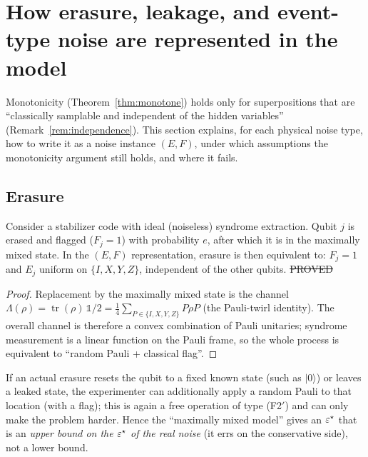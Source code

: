 \section{How erasure, leakage, and event-type noise are represented in the model}\label{sec:repr}

Monotonicity (Theorem~\ref{thm:monotone}) holds only for superpositions that are ``classically samplable and independent of the hidden variables''
(Remark~\ref{rem:independence}). This section explains, for each physical noise type, how to write it as a noise instance $(E,F)$,
under which assumptions the monotonicity argument still holds, and where it fails.

\subsection{Erasure}

\begin{proposition}[Erasure = flagged completely depolarizing noise]\label{prop:erasure}
Consider a stabilizer code with ideal (noiseless) syndrome extraction. Qubit $j$ is erased and flagged ($F_j=1$) with probability $e$, after which it is in the maximally mixed state.
In the $(E,F)$ representation, erasure is then equivalent to: $F_j=1$ and $E_j$ uniform on $\{I,X,Y,Z\}$, independent of the other qubits.
\hfill\st{PROVED}
\end{proposition}
\begin{proof}
Replacement by the maximally mixed state is the channel $\Lambda(\rho)=\operatorname{tr}(\rho)\,\mathbb 1/2=\tfrac14\sum_{P\in\{I,X,Y,Z\}}P\rho P$
(the Pauli-twirl identity). The overall channel is therefore a convex combination of Pauli unitaries; syndrome measurement is a linear function on the Pauli frame,
so the whole process is equivalent to ``random Pauli + classical flag''.
\end{proof}

\begin{remark}[Conservativeness]
If an actual erasure resets the qubit to a fixed known state (such as $\lvert 0\rangle$) or leaves a leaked state, the experimenter can additionally apply a random Pauli to that location
(with a flag); this is again a free operation of type (F2$'$) and can only make the problem harder. Hence the ``maximally mixed model'' gives an
$\varepsilon^{\star}$ that is an \emph{upper bound on the $\varepsilon^{\star}$ of the real noise} (it errs on the conservative side), not a lower bound.
\end{remark}

